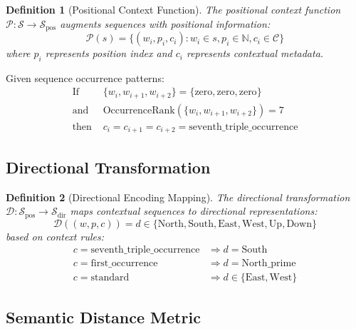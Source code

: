 \documentclass[12pt,a4paper]{article}
\newtheorem{definition}{Definition}
\begin{document}
\begin{definition}[Positional Context Function]
The positional context function $\mathcal{P}: \mathcal{S} \to \mathcal{S}_{\text{pos}}$ augments sequences with positional information:
\begin{equation}
\mathcal{P}(s) = \{(w_i, p_i, c_i) : w_i \in s, p_i \in \mathbb{N}, c_i \in \mathcal{C}\}
\end{equation}
where $p_i$ represents position index and $c_i$ represents contextual metadata.
\end{definition}

\begin{example}
Given sequence occurrence patterns:
\begin{align}
\text{If } &\{w_i, w_{i+1}, w_{i+2}\} = \{\text{zero}, \text{zero}, \text{zero}\} \\
\text{and } &\text{OccurrenceRank}(\{w_i, w_{i+1}, w_{i+2}\}) = 7 \\
\text{then } &c_i = c_{i+1} = c_{i+2} = \text{seventh\_triple\_occurrence}
\end{align}
\end{example}

\subsection{Directional Transformation}

\begin{definition}[Directional Encoding Mapping]
The directional transformation $\mathcal{D}: \mathcal{S}_{\text{pos}} \to \mathcal{S}_{\text{dir}}$ maps contextual sequences to directional representations:
\begin{equation}
\mathcal{D}((w, p, c)) = d \in \{\text{North}, \text{South}, \text{East}, \text{West}, \text{Up}, \text{Down}\}
\end{equation}
based on context rules:
\begin{align}
c = \text{seventh\_triple\_occurrence} &\Rightarrow d = \text{South} \\
c = \text{first\_occurrence} &\Rightarrow d = \text{North\_prime} \\
c = \text{standard} &\Rightarrow d \in \{\text{East}, \text{West}\}
\end{align}
\end{definition}

\subsection{Semantic Distance Metric}
\end{document}
